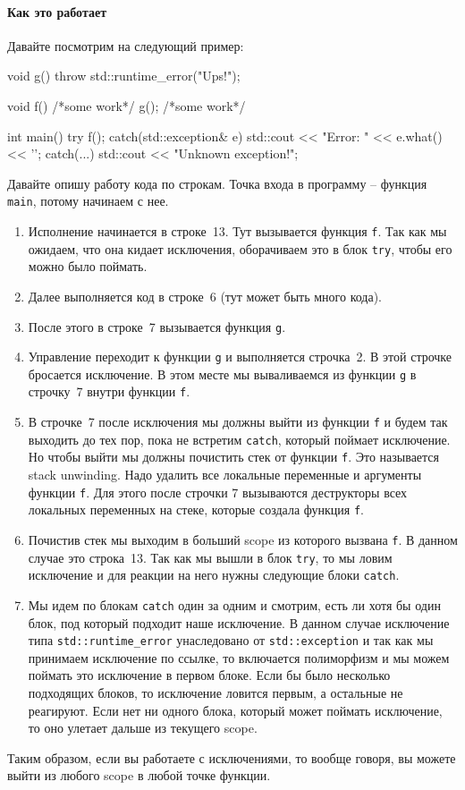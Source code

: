 \paragraph{Как это работает}

Давайте посмотрим на следующий пример:
\begin{cppcode}
void g() {
  throw std::runtime_error("Ups!");
}

void f() {
  /*some work*/
  g();
  /*some work*/
}

int main() {
  try {
    f();
  } catch(std::exception& e) {
    std::cout << "Error: " << e.what() << '\n';
  } catch(...) {
    std::cout << "Unknown exception!\n";
  }
}
\end{cppcode}
Давайте опишу работу кода по строкам.
Точка входа в программу -- функция \verb"main", потому начинаем с нее.
\begin{enumerate}
\item Исполнение начинается в строке~13.
Тут вызывается функция \verb"f".
Так как мы ожидаем, что она кидает исключения, оборачиваем это в блок \verb"try", чтобы его можно было поймать.

\item Далее выполняется код в строке~6 (тут может быть много кода).

\item После этого в строке~7 вызывается функция \verb"g".

\item Управление переходит к функции \verb"g" и выполняется строчка~2.
В этой строчке бросается исключение.
В этом месте мы вываливаемся из функции \verb"g" в строчку~7 внутри функции \verb"f".

\item В строчке~7 после исключения мы должны выйти из функции \verb"f" и будем так выходить до тех пор, пока не встретим \verb"catch", который поймает исключение.
Но чтобы выйти мы должны почистить стек от функции \verb"f".
Это называется stack unwinding.
Надо удалить все локальные переменные и аргументы функции \verb"f".
Для этого после строчки 7 вызываются деструкторы всех локальных переменных на стеке, которые создала функция \verb"f".

\item Почистив стек мы выходим в больший scope из которого вызвана \verb"f".
В данном случае это строка~13.
Так как мы вышли в блок \verb"try", то мы ловим исключение и для реакции на него нужны следующие блоки \verb"catch".

\item Мы идем по блокам \verb"catch" один за одним и смотрим, есть ли хотя бы один блок, под который подходит наше исключение.
В данном случае исключение типа \verb"std::runtime_error" унаследовано от \verb"std::exception" и так как мы принимаем исключение по ссылке, то включается полиморфизм и мы можем поймать это исключение в первом блоке.
Если бы было несколько подходящих блоков, то исключение ловится первым, а остальные не реагируют.
Если нет ни одного блока, который может поймать исключение, то оно улетает дальше из текущего scope.
\end{enumerate}
Таким образом, если вы работаете с исключениями, то вообще говоря, вы можете выйти из любого scope в любой точке функции.

